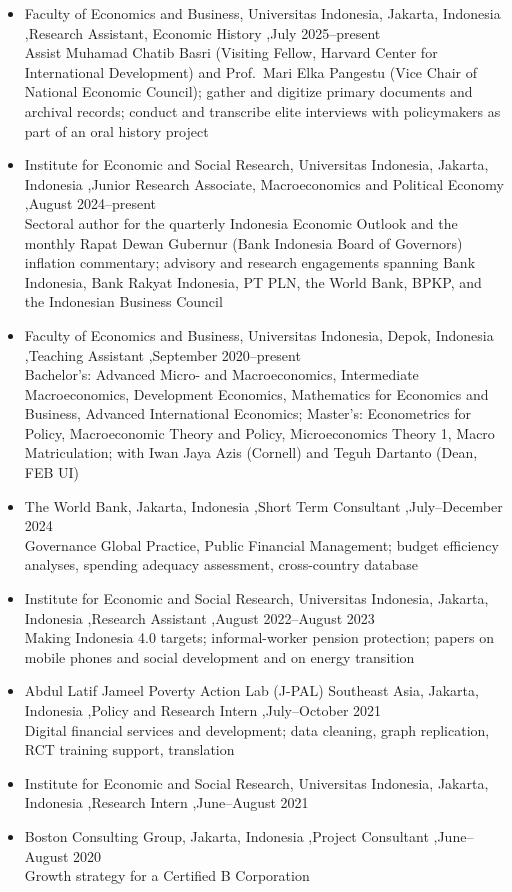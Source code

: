 \documentclass[letterpaper,10pt]{article}
\begin{document}


\begin{itemize}
\item Faculty of Economics and Business, Universitas Indonesia, Jakarta, Indonesia \sep Research Assistant, Economic History \sep July 2025--present\\
Assist Muhamad Chatib Basri (Visiting Fellow, Harvard Center for International Development) and Prof.\ Mari Elka Pangestu (Vice Chair of National Economic Council); gather and digitize primary documents and archival records; conduct and transcribe elite interviews with policymakers as part of an oral history project
\item Institute for Economic and Social Research, Universitas Indonesia, Jakarta, Indonesia \sep Junior Research Associate, Macroeconomics and Political Economy \sep August 2024--present\\
Sectoral author for the quarterly Indonesia Economic Outlook and the monthly Rapat Dewan Gubernur (Bank Indonesia Board of Governors) inflation commentary; advisory and research engagements spanning Bank Indonesia, Bank Rakyat Indonesia, PT PLN, the World Bank, BPKP, and the Indonesian Business Council
\item Faculty of Economics and Business, Universitas Indonesia, Depok, Indonesia \sep Teaching Assistant \sep September 2020--present\\
Bachelor's: Advanced Micro- and Macroeconomics, Intermediate Macroeconomics, Development Economics, Mathematics for Economics and Business, Advanced International Economics; Master's: Econometrics for Policy, Macroeconomic Theory and Policy, Microeconomics Theory 1, Macro Matriculation; with Iwan Jaya Azis (Cornell) and Teguh Dartanto (Dean, FEB UI)
\item The World Bank, Jakarta, Indonesia \sep Short Term Consultant \sep July--December 2024\\
Governance Global Practice, Public Financial Management; budget efficiency analyses, spending adequacy assessment, cross-country database
\item Institute for Economic and Social Research, Universitas Indonesia, Jakarta, Indonesia \sep Research Assistant \sep August 2022--August 2023\\
Making Indonesia 4.0 targets; informal-worker pension protection; papers on mobile phones and social development and on energy transition
\item Abdul Latif Jameel Poverty Action Lab (J-PAL) Southeast Asia, Jakarta, Indonesia \sep Policy and Research Intern \sep July--October 2021\\
Digital financial services and development; data cleaning, graph replication, RCT training support, translation
\item Institute for Economic and Social Research, Universitas Indonesia, Jakarta, Indonesia \sep Research Intern \sep June--August 2021
\item Boston Consulting Group, Jakarta, Indonesia \sep Project Consultant \sep June--August 2020\\
Growth strategy for a Certified B Corporation
\end{itemize}
\end{document}
